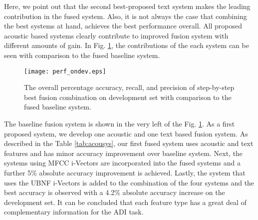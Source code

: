 \documentclass{article}
\begin{document}
    \noindent Here, we point out that the second best-proposed text system makes the leading contribution in the fused system. Also, it is not always the case that combining the best systems at hand, achieves the best performance overall. All proposed acoustic based systems clearly contribute to improved fusion system with different amounts of gain. In Fig. \ref{fig:perffusesysvsbase}, the contributions of the each system can be seen with comparison to the fused baseline system.



\vspace{-12pt}
\begin{figure}[htb]
\caption{The overall percentage accuracy, recall, and precision of step-by-step best fusion combination on development set with comparison to the fused baseline system.}
\label{fig:perffusesysvsbase}
\texttt{[image: perf\_ondev.eps]}
\end{figure}
\vspace{-8pt}

\noindent The baseline fusion system is shown in the very left of the Fig. \ref{fig:perffusesysvsbase}. As a first proposed system, we develop one acoustic and one text based fusion system. As described in the Table \ref{tab:acousys}, our first fused system uses acoustic and text features and has minor accuracy improvement over baseline system. Next, the systems using MFCC i-Vectors are incorporated into the fused systems and a further 5\% absolute accuracy improvement is achieved. Lastly, the system that uses the UBNF i-Vectors is added to the combination of the four systems and the best accuracy is observed with a 4.2\% absolute accuracy increase on the development set. It can be concluded that each feature type has a great deal of complementary information for the ADI task.
\end{document}
